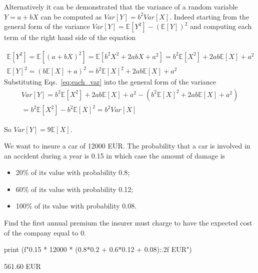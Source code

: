 \begin{solution}
Alternatively it can be demonstrated that the variance of a random variable $Y = a + bX$ can be computed as $Var[Y] = b^2 Var[X]$. Indeed starting from the general form of the variance $Var[Y] = \mathbb{E}[Y^2] - (\mathbb{E}[Y])^2$ and computing each term of the right hand side of the equation 

\begin{equation}
\begin{gathered}
\mathbb{E}[Y^2] = \mathbb{E}[(a+bX)^2] = \mathbb{E}[b^2X^2 + 2abX + a^2] = b^2\mathbb{E}[X^2] + 2ab\mathbb{E}[X]+ a^2  \\
\mathbb{E}[Y]^2 =  (b\mathbb{E}[X] + a)^2 = b^2\mathbb{E}[X]^2 + 2ab\mathbb{E}[X]+ a^2  
\label{eq:each_var}
\end{gathered}
\end{equation}
Substituting Eqs.~\ref{eq:each_var} into the general form of the variance 
\begin{equation}
\begin{gathered}
Var[Y] = b^2\mathbb{E}[X^2] + 2ab\mathbb{E}[X]+ a^2 - (b^2\mathbb{E}[X]^2 + 2ab\mathbb{E}[X]+ a^2) \\ 
= b^2\mathbb{E}[X^2] - b^2\mathbb{E}[X]^2 = b^2 Var[X]
\end{gathered}     
\end{equation}

So $Var[Y] = 9\mathbb{E}[X]$.
\end{solution}

\begin{question}
We want to insure a car of 12000 EUR. The probability that a car is involved in an accident during a year is 0.15 in which case the amount of damage is

\begin{itemize}
\tightlist
\item 20\% of its value with probability 0.8;
\item 60\% of its value with probability 0.12;
\item 100\% of its value with probability 0.08.
\end{itemize}
Find the first annual premium the insurer must charge to have the expected cost of the company equal to 0.
\end{question}

\cprotEnv\begin{solution}
\begin{ipython}
print (f"{0.15 * 12000 * (0.8*0.2 + 0.6*0.12 + 0.08):.2f} EUR")
\end{ipython}
\begin{ioutput}
561.60 EUR
\end{ioutput}
\end{solution}

